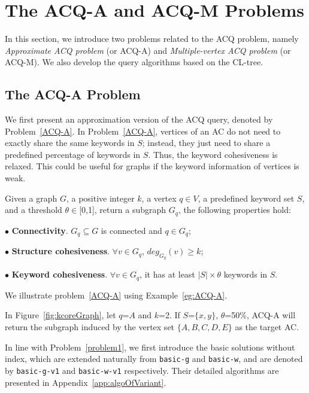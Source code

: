 {\color{blue}
\section{The ACQ-A and ACQ-M Problems}
\label{variant}

In this section, we introduce two problems related to the ACQ problem, namely
{\it Approximate ACQ problem} (or ACQ-A) and {\it Multiple-vertex ACQ problem} (or ACQ-M).
We also develop the query algorithms based on the CL-tree.


\subsection{The ACQ-A Problem}

We first present an approximation version of the ACQ query, denoted by Problem~\ref{ACQ-A}.
In Problem~\ref{ACQ-A}, vertices of an AC do not need to exactly share the same keywords in $S$;
instead, they just need to share a predefined percentage of keywords in $S$.
Thus, the keyword cohesiveness is relaxed.
This could be useful for graphs if the keyword information of vertices is weak.

\begin{problem}[ACQ-A]
\label{ACQ-A}
Given a graph $G$, a positive integer $k$, a vertex $q \in V$, a predefined keyword set $S$,
and a threshold $\theta\in$[0,1], return a subgraph $G_q$, the following properties hold:

$\bullet$ \textbf{Connectivity}. $G_q \subseteq G$ is connected and $q\in G_q$;

$\bullet$ \textbf{Structure cohesiveness}. $\forall$$v\in G_q$, $deg_{G_q}(v)\geq$$k$;

$\bullet$ \textbf{Keyword cohesiveness}. $\forall v\in G_q$, it has at least $|S|\times \theta$ keywords in $S$.
\end{problem}

We illustrate problem~\ref{ACQ-A} using Example~\ref{eg:ACQ-A}.
\begin{example}
\label{eg:ACQ-A}
In Figure~\ref{fig:kcoreGraph}, let $q$=$A$ and $k$=2.
If $S$=$\{x,y\}$, $\theta$=50\%, ACQ-A will return the subgraph induced by the vertex set $\{A,B,C,D,E\}$ as the target AC.
\end{example}

In line with Problem~\ref{problem1}, we first introduce the basic solutions without index,
which are extended naturally from {\tt basic-g} and {\tt basic-w},
and are denoted by {\tt basic-g-v1} and {\tt basic-w-v1} respectively.
Their detailed algorithms are presented in Appendix~\ref{app:algoOfVariant}.

}
